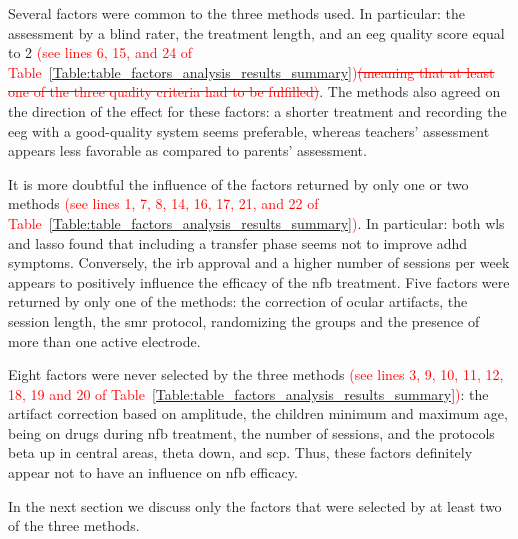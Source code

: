 Several factors were common to the three methods used. In particular: the assessment 
by a blind rater, the treatment length, and an \gls{eeg} quality score equal to 2 \textcolor{red}{(see lines 6, 15, and 24 of 
Table~\ref{Table:table_factors_analysis_results_summary})}\textcolor{red}{\sout{(meaning that at least one of the three quality criteria had to be fulfilled)}}.
The methods also agreed on the direction of the effect for these factors: 
a shorter treatment and recording the \gls{eeg} with a good-quality system seems preferable, whereas teachers' assessment appears less favorable
as compared to parents' assessment.

It is more doubtful the influence of the factors returned by only one or two methods \textcolor{red}{(see lines 1, 7, 8, 14, 16, 17, 21, and 22
 of Table~\ref{Table:table_factors_analysis_results_summary})}. In particular: 
both \gls{wls} and \gls{lasso} found that including a transfer phase seems not to improve \gls{adhd} symptoms. 
Conversely, the \gls{irb} approval and a higher number of sessions per week appears to positively influence the efficacy of the \gls{nfb} treatment. 
Five factors were returned by only one of the methods: the correction of ocular artifacts, the session length, the \gls{smr} protocol, 
randomizing the groups and the presence of more than one active electrode.  

Eight factors were never selected by the three methods \textcolor{red}{(see lines 3, 9, 10, 11, 12, 18, 19 and 20 of 
Table~\ref{Table:table_factors_analysis_results_summary})}: the artifact correction based on amplitude, the children minimum and maximum age, 
being on drugs during \gls{nfb} treatment, the number of sessions, and the protocols beta up in central areas, theta down, and \gls{scp}. 
Thus, these factors definitely appear not to have an influence on \gls{nfb} efficacy.  

In the next section we discuss only the factors that were selected by at least two of the three methods. 

